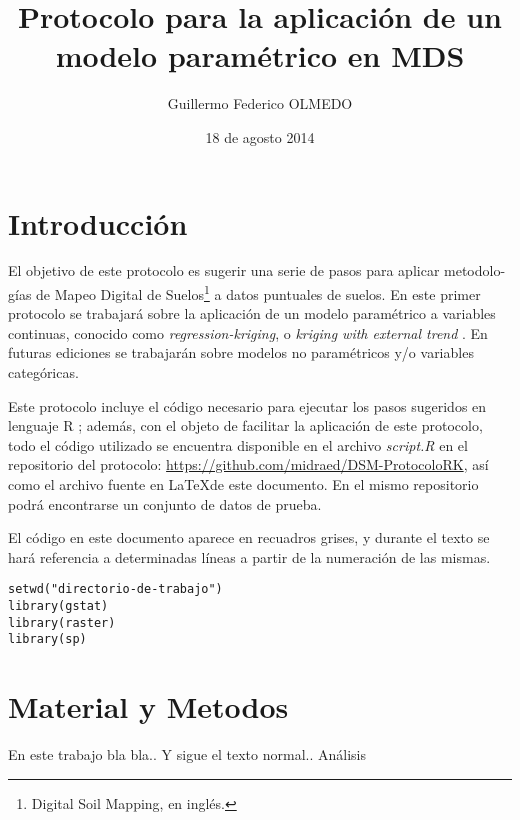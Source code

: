 \documentclass[10pt,a4paper]{article}
\date{18 de agosto 2014}
\title{Protocolo para la aplicación de un modelo paramétrico en MDS}
\author{Guillermo Federico OLMEDO}
\begin{document}
\maketitle
\section{Introducción}
El objetivo de este protocolo es sugerir una serie de pasos para aplicar metodolo- gías de Mapeo Digital de Suelos\footnote{Digital Soil Mapping, en inglés.} a datos puntuales de suelos. En este primer protocolo se trabajará sobre la aplicación de un modelo paramétrico a variables continuas, conocido como \textit{regression-kriging}, o \textit{kriging with external trend} \citep{hengl_practical_2009}. En futuras ediciones se trabajarán sobre modelos no paramétricos y/o variables categóricas. 

Este protocolo incluye el código necesario para ejecutar los pasos sugeridos en lenguaje R \citep{R}; además, con el objeto de facilitar la aplicación de este protocolo, todo el código utilizado se encuentra disponible en el archivo \textit{script.R} en el repositorio del protocolo: 
\url{https://github.com/midraed/DSM-ProtocoloRK}, así como el archivo fuente en \LaTeX\space de este documento. En el mismo repositorio podrá encontrarse un conjunto de datos de prueba.

El código en este documento aparece en recuadros grises, y durante el texto se hará referencia a determinadas líneas a partir de la numeración de las mismas.
\begin{lstlisting}
setwd("directorio-de-trabajo")
library(gstat)
library(raster)
library(sp)
\end{lstlisting}
\section{Material y Metodos}
En este trabajo bla bla.. \citep*{graziotin_web-based_2013}
Y sigue el texto normal..\citep*{webster_geostatistics_2007} Análisis
\end{document}
